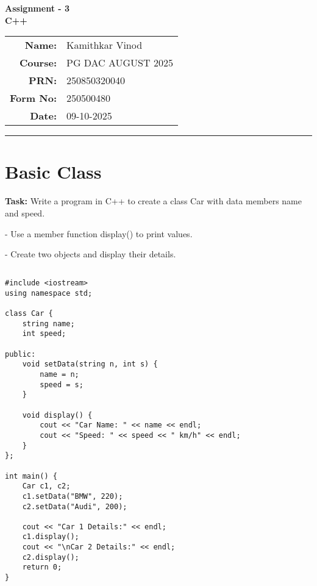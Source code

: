\documentclass[12pt,a4paper]{article}
\begin{document}
\begin{center}
    \LARGE \textbf{Assignment - 3} \\[0.5cm]
    \Large \textbf{C++} \\[1cm]

    \begin{tabular}{rl}
        \textbf{Name:} & Kamithkar Vinod \\
        \textbf{Course:} & PG DAC AUGUST 2025 \\
        \textbf{PRN:} & 250850320040 \\
        \textbf{Form No:} & 250500480 \\
        \textbf{Date:} & 09-10-2025 \\
    \end{tabular}
\end{center}

\vspace{1cm}
\hrule
\vspace{0.5cm}

\section{Basic Class}
\textbf{Task:} Write a program in C++ to create a class Car with data members name and speed.
    \item - Use a member function display() to print values.
    \item - Create two objects and display their details.


\subsection{}
\begin{lstlisting}
#include <iostream>
using namespace std;

class Car {
    string name;
    int speed;

public:
    void setData(string n, int s) {
        name = n;
        speed = s;
    }

    void display() {
        cout << "Car Name: " << name << endl;
        cout << "Speed: " << speed << " km/h" << endl;
    }
};

int main() {
    Car c1, c2;
    c1.setData("BMW", 220);
    c2.setData("Audi", 200);

    cout << "Car 1 Details:" << endl;
    c1.display();
    cout << "\nCar 2 Details:" << endl;
    c2.display();
    return 0;
}


\end{lstlisting}
\end{document}
